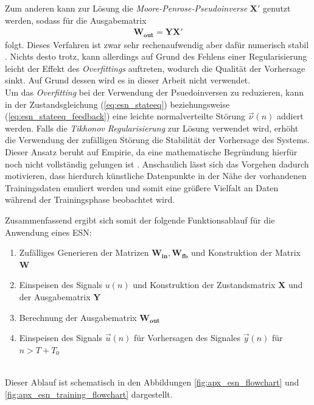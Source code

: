 Zum anderen kann zur Lösung die \textit{Moore-Penrose-Pseudoinverse} $\mathbf{X}'$ genutzt werden, sodass für die Ausgabematrix
\begin{align}
\label{eq:pseudo_inverse}
\mathbf{W_{out}} = \mathbf{Y} \mathbf{X}'
\end{align}
folgt. Dieses Verfahren ist zwar sehr rechenaufwendig aber dafür numerisch stabil \cite{lukoseviciusa2009, jaeger2012}. Nichts desto trotz, kann allerdings auf Grund des Fehlens einer Regularisierung leicht der Effekt des \textit{Overfittings} auftreten, wodurch die Qualität der Vorhersage sinkt. Auf Grund dessen wird es in dieser Arbeit nicht verwendet.\\

Um das \textit{Overfitting} bei der Verwendung der Psuedoinversen zu reduzieren, kann in der Zustandsgleichung (\ref{eq:esn_stateeq}) beziehungsweise (\ref{eq:esn_stateeq_feedback}) eine leichte normalverteilte Störung $\vec{\nu}(n)$ addiert werden. Falls die \textit{Tikhonov Regularisierung} zur Lösung verwendet wird, erhöht die Verwendung der zufälligen Störung die Stabilität der Vorhersage des Systems. Dieser Ansatz beruht auf Empirie, da eine mathematische Begründung hierfür noch nicht vollständig gelungen ist \citep{jaeger2010, lukoseviciusa2009}. Anschaulich lässt sich das Vorgehen dadurch motivieren, dass hierdurch künstliche Datenpunkte in der Nähe der vorhandenen Trainingsdaten emuliert werden und somit eine größere Vielfalt an Daten während der Trainingsphase beobachtet wird.\\

\hspace{-0.5cm}
\begin{minipage}{\textwidth}
Zusammenfassend ergibt sich somit der folgende Funktionsablauf für die Anwendung eines \textsc{ESN}:

\singlespacing
\begin{enumerate}
	\item Zufälliges Generieren der Matrizen $\mathbf{W_{in}}, \mathbf{W_{fb}}$ und Konstruktion der Matrix $\mathbf{W}$ 
	\item Einspeisen des Signals $u(n)$ und Konstruktion der Zustandsmatrix $\mathbf{X}$ und der Ausgabematrix $\mathbf{Y}$ 
	\item Berechnung der Ausgabematrix $\mathbf{W_{out}}$
	\item Einspeisen des Signals $\vec{u}(n)$ für Vorhersagen des Signales $\vec{y}(n)$ für $n > T + T_0$
\end{enumerate}
\onehalfspacing
\end{minipage}\\

Dieser Ablauf ist schematisch in den Abbildungen \ref{fig:apx_esn_flowchart} und \ref{fig:apx_esn_training_flowchart} dargestellt.

